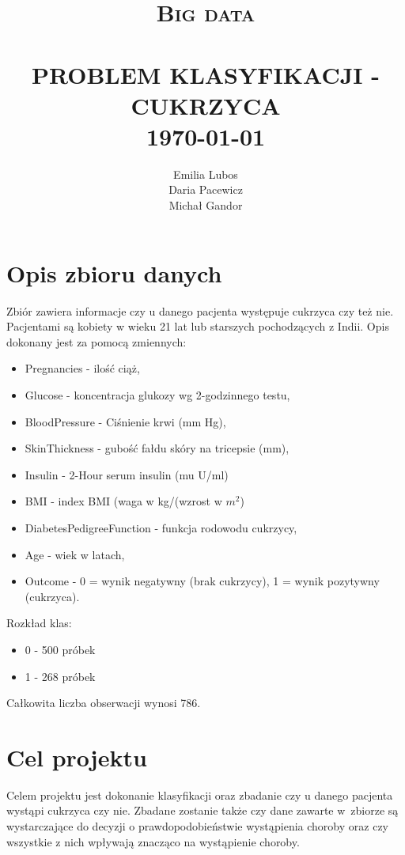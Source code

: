 \documentclass[12pt]{article}
\title{	\normalsize \textsc{Big data} 	%
		 	\\[2.0cm]								%
			\HRule{0.5pt} \\						%
			\LARGE \textbf{\uppercase{Problem klasyfikacji - cukrzyca}}	%
			\HRule{2pt} \\ [0.5cm]		%
			\normalsize \today			%
		}
\author{
		Emilia Lubos\\
		Daria Pacewicz\\
		Michał Gandor\\		
}
\makeatletter
\def\printtitle{%
    {\centering \@title\par}}
\def\printauthor{%
    {\centering \large \@author}}
\makeatother
\begin{document}
\thispagestyle{empty}		%

\printtitle					%
  	\vfill
\printauthor				%
\section{Opis zbioru danych}

Zbiór zawiera informacje czy u danego pacjenta występuje cukrzyca czy też nie. Pacjentami są kobiety w wieku 21 lat lub starszych pochodzących z Indii. Opis dokonany jest za pomocą zmiennych:

\begin{itemize}
\item Pregnancies - ilość ciąż,
\item Glucose - koncentracja glukozy wg 2-godzinnego testu,
\item BloodPressure - Ciśnienie krwi (mm Hg),
\item SkinThickness - gubość fałdu skóry na tricepsie (mm),
\item Insulin - 2-Hour serum insulin (mu U/ml)
\item BMI - index BMI (waga w kg/(wzrost w $m^2$)
\item DiabetesPedigreeFunction - funkcja rodowodu cukrzycy,
\item Age - wiek w latach,
\item Outcome - 0 = wynik negatywny (brak cukrzycy), 1 = wynik pozytywny (cukrzyca).
\end{itemize}

Rozkład klas:

\begin{itemize}
\item 0 - 500 próbek
\item 1 - 268 próbek
\end{itemize}

Całkowita liczba obserwacji wynosi 786.

\section{Cel projektu}

Celem projektu jest dokonanie klasyfikacji oraz zbadanie czy u danego pacjenta wystąpi cukrzyca czy nie. Zbadane zostanie także czy dane zawarte w~zbiorze są wystarczające do decyzji o prawdopodobieństwie wystąpienia choroby oraz czy wszystkie z nich wpływają znacząco na wystąpienie choroby.
\end{document}
